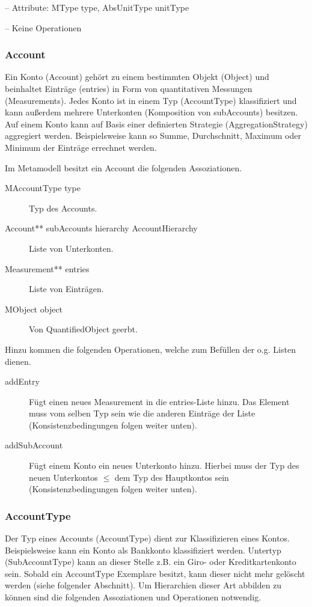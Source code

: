 
-- Attribute: MType type, AbsUnitType unitType

-- Keine Operationen


\subsubsection{Account}
Ein Konto (Account) gehört zu einem bestimmten Objekt (Object) und beinhaltet Einträge (entries) in Form von quantitativen Messungen (Measurements). 
Jedes Konto ist in einem Typ (AccountType) klassifiziert und kann außerdem mehrere Unterkonten (Komposition von subAccounts) besitzen.
Auf einem Konto kann auf Basis einer definierten Strategie (AggregationStrategy) aggregiert werden. 
Beispielsweise kann so Summe, Durchschnitt, Maximum oder Minimum der Einträge errechnet werden. 

Im Metamodell besitzt ein Account die folgenden Assoziationen.
\begin{description}
	\item[MAccountType type] Typ des Accounts.
	\item[Account** subAccounts hierarchy AccountHierarchy] Liste von Unterkonten.
	\item[Measurement** entries] Liste von Einträgen.
	\item[MObject object] Von QuantifiedObject geerbt.
\end{description}

Hinzu kommen die folgenden Operationen, welche zum Befüllen der o.g. Listen dienen.
\begin{description}
	\item[addEntry] Fügt einen neues Measurement in die entries-Liste hinzu. Das Element muss vom selben Typ sein wie die anderen Einträge der Liste (Konsistenzbedingungen folgen weiter unten).  
	\item[addSubAccount] Fügt einem Konto ein neues Unterkonto hinzu. Hierbei muss der Typ des neuen Unterkontos $\leq$ dem Typ des Hauptkontos sein (Konsistenzbedingungen folgen weiter unten).
\end{description}


\subsubsection{AccountType}
Der Typ eines Accounts (AccountType) dient zur Klassifizieren eines Kontos. Beispielsweise kann ein Konto als Bankkonto klassifiziert werden. Untertyp (SubAccountType) kann an dieser Stelle z.B. ein Giro- oder Kreditkartenkonto sein.
Sobald ein AccountType Exemplare besitzt, kann dieser nicht mehr gelöscht werden (siehe folgender Abschnitt). Um Hierarchien dieser Art abbilden zu können sind die folgenden Assoziationen und Operationen notwendig. 

